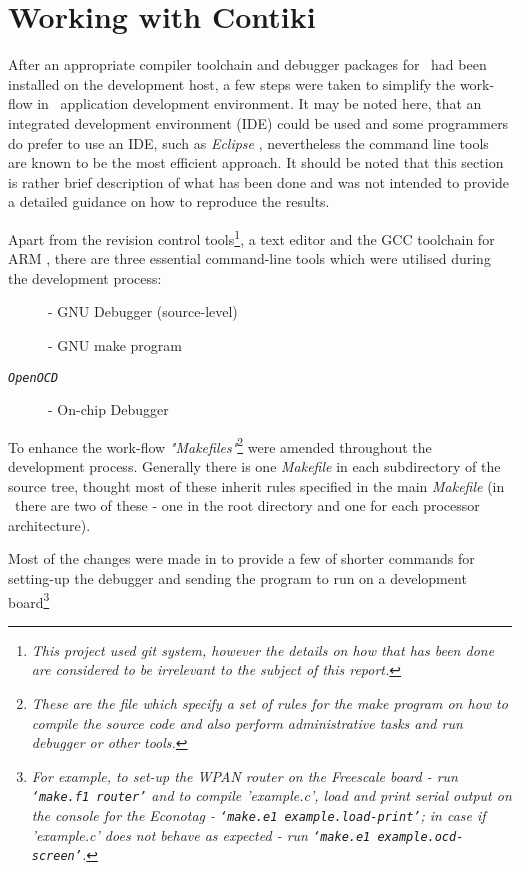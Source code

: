 \section{Working with Contiki}
  
  After an appropriate compiler toolchain and debugger packages for \MCX\
 had been installed on the development host, a few steps were taken to
 simplify the work-flow in \Contiki\ application development environment.
 It may be noted here, that an integrated development environment (IDE)
 could be used and some programmers do prefer to use an IDE, such as
 \emph{Eclipse} \cite{links:contiki:eclipse, links:mc1322x:eclipse},
 nevertheless the command line tools are known to be the most efficient approach.
 It should be noted that this section is rather brief description of what
 has been done and was not intended to provide a detailed guidance on how
 to reproduce the results.

  Apart from the revision control tools\footnote{\emph{This project used
 git system, however the details on how that has been done are considered
 to be irrelevant to the subject of this report.}}, a text editor and the
 GCC toolchain for ARM \cite{links:mc1322x:gcc}, there are three essential
 command-line tools which were utilised during the development process:

\begin{description}
	\item [] - GNU Debugger (source-level) \cite{docs:gdb:manual}
	\item [\MANX{1}{make}] - GNU make program \cite{docs:make:manual}
	\item [\emph{\texttt{OpenOCD}}] - On-chip Debugger \cite{links:mc1322x:ocd}
\end{description}


  To enhance the work-flow \emph{"Makefiles"}\footnote{\emph{These are
 the file which specify a set of rules for the make program on how to
 compile the source code and also perform administrative tasks and run
 debugger or other tools.}} were amended throughout the development
 process. Generally there is one \emph{Makefile} in each subdirectory
 of the source tree, thought most of these inherit rules specified in
 the main \emph{Makefile} (in \Contiki\ there are two of these - one
 in the root directory and one for each processor architecture).

 Most of the changes were made in 
 to provide a few of shorter commands for setting-up the debugger
 and sending the program to run on a development board\footnote{
 \emph{For example, to set-up the WPAN router on the Freescale board - run
 \texttt{`make.f1 router'} and to compile 'example.c', load and print
 serial output on the console for the Econotag  -
 \texttt{`make.e1 example.load-print'}; in case if 'example.c' does
 not behave as expected - run \texttt{`make.e1 example.ocd-screen'}.}}
 
